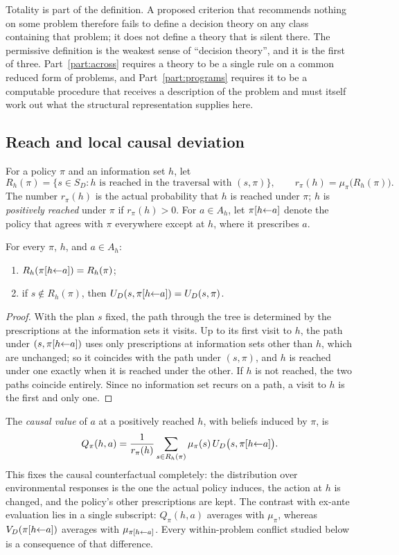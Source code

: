 Totality is part of the definition. A proposed criterion that recommends nothing on some problem
therefore fails to define a decision theory on any class containing that problem; it does not
define a theory that is silent there. The permissive definition is the weakest sense of
\enquote{decision theory}, and it is the first of three. Part~\ref{part:across} requires a theory to be a
single rule on a common reduced form of problems, and Part~\ref{part:programs} requires it to be a
computable procedure that receives a description of the problem and must itself work out what the
structural representation supplies here.

\subsection{Reach and local causal deviation}

For a policy $\pi$ and an information set $h$, let
\[
  R_h(\pi)=\{s\in S_D: h\text{ is reached in the traversal with }(s,\pi)\},
  \qquad
  r_\pi(h)=\mu_\pi\bigl(R_h(\pi)\bigr).
\]
The number $r_\pi(h)$ is the actual probability that $h$ is reached under $\pi$; $h$ is
\emph{positively reached} under $\pi$ if $r_\pi(h)>0$. For $a\in A_h$, let $\pi[h{\leftarrow}a]$ denote the
policy that agrees with $\pi$ everywhere except at $h$, where it prescribes $a$.

\begin{lemma}\label{lem:local}
For every $\pi$, $h$, and $a\in A_h$:
\begin{enumerate}[label=(\roman*)]
  \item $R_h(\pi[h{\leftarrow}a])=R_h(\pi)$;
  \item if $s\notin R_h(\pi)$, then $U_D(s,\pi[h{\leftarrow}a])=U_D(s,\pi)$.
\end{enumerate}
\end{lemma}

\begin{proof}
With the plan $s$ fixed, the path through the tree is determined by the prescriptions at the
information sets it visits. Up to its first visit to $h$, the path under $(s,\pi[h{\leftarrow}a])$ uses
only prescriptions at information sets other than $h$, which are unchanged; so it coincides with the
path under $(s,\pi)$, and $h$ is reached under one exactly when it is reached under the other. If
$h$ is not reached, the two paths coincide entirely. Since no information set recurs on a path, a
visit to $h$ is the first and only one.
\end{proof}

The \emph{causal value} of $a$ at a positively reached $h$, with beliefs induced by $\pi$, is
\[
  Q_\pi(h,a)=\frac{1}{r_\pi(h)}\sum_{s\in R_h(\pi)}\mu_\pi(s)\,U_D\bigl(s,\pi[h{\leftarrow}a]\bigr).
\]
This fixes the causal counterfactual completely: the distribution over environmental responses is
the one the actual policy induces, the action at $h$ is changed, and the policy's other
prescriptions are kept. The contrast with ex-ante evaluation lies in a single subscript:
$Q_\pi(h,a)$ averages with $\mu_\pi$, whereas $V_D(\pi[h{\leftarrow}a])$ averages with
$\mu_{\pi[h{\leftarrow}a]}$. Every within-problem conflict studied below is a consequence of that
difference.
